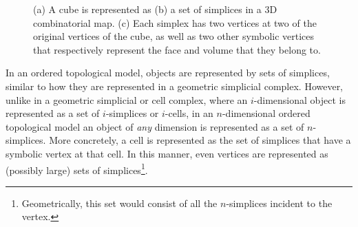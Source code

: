 \begin{figure}[tb]
\centering
{}
{}
{}
\caption[A cube represented as a 3D combinatorial map]{(a) A cube is represented as (b) a set of simplices in a 3D combinatorial map. (c) Each simplex has two vertices at two of the original vertices of the cube, as well as two other symbolic vertices that respectively represent the face and volume that they belong to.}
\label{fig:cmap-cube}
\end{figure}

In an ordered topological model, objects are represented by sets of simplices, similar to how they are represented in a geometric simplicial complex.
However, unlike in a geometric simplicial or cell complex, where an $i$-dimensional object is represented as a set of $i$-simplices or $i$-cells, in an $n$-dimensional ordered topological model an object of \emph{any} dimension is represented as a set of $n$-simplices.
More concretely, a cell is represented as the set of simplices that have a symbolic vertex at that cell.
In this manner, even vertices are represented as (possibly large) sets of simplices\footnote{Geometrically, this set would consist of all the $n$-simplices incident to the vertex.}.

